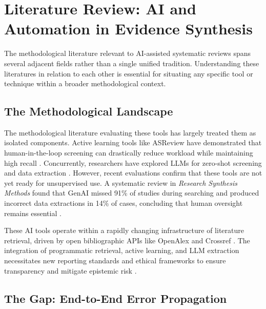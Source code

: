 \documentclass[12pt]{article}
\begin{document}
\section{Literature Review: AI and Automation in Evidence Synthesis}

The methodological literature relevant to AI-assisted systematic reviews spans several adjacent fields rather than a single unified tradition. Understanding these literatures in relation to each other is essential for situating any specific tool or technique within a broader methodological context.

\subsection{The Methodological Landscape}

The methodological literature evaluating these tools has largely treated them as isolated components. Active learning tools like ASReview have demonstrated that human-in-the-loop screening can drastically reduce workload while maintaining high recall \cite{vandeschoot2021asreview, teijema2023}. Concurrently, researchers have explored LLMs for zero-shot screening and data extraction \cite{qiao2024, mahmoudi2025, kim2025}. However, recent evaluations confirm that these tools are not yet ready for unsupervised use. A systematic review in \textit{Research Synthesis Methods} found that GenAI missed 91\% of studies during searching and produced incorrect data extractions in 14\% of cases, concluding that human oversight remains essential \cite{clark2025, lieberum2025}. 

These AI tools operate within a rapidly changing infrastructure of literature retrieval, driven by open bibliographic APIs like OpenAlex and Crossref \cite{priem2022openalex, delgado2024, culbert2025}. The integration of programmatic retrieval, active learning, and LLM extraction necessitates new reporting standards and ethical frameworks to ensure transparency and mitigate epistemic risk \cite{page2021prisma, rethlefsen2021prismas, chong2025smart, flemyng2025ai, mittelstadt2019ethics, harris2023epistemic, bender2021stochastic, markham2012ethical}.

\subsection{The Gap: End-to-End Error Propagation}
\end{document}
